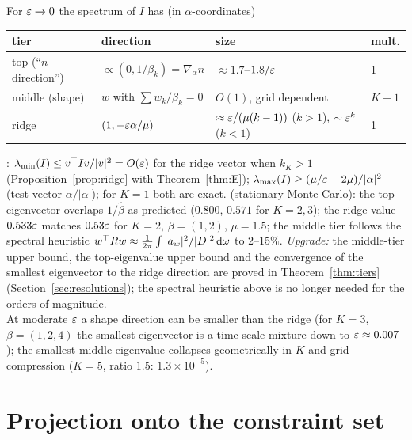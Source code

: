 \begin{proposition}\label{prop:tiers}
For $\varepsilon\to0$ the spectrum of $I$ has (in $\alpha$-coordinates)
\begin{center}
\begin{tabular}{@{}llll@{}}\toprule
tier & direction & size & mult.\\\midrule
top (``$n$-direction'') & $\propto(0,1/\beta_k)=\nabla_\alpha n$ & $\approx1.7$--$1.8/\varepsilon$ & 1\\
middle (shape) & $w$ with $\sum w_k/\beta_k=0$ & $O(1)$, grid dependent & $K-1$\\
ridge & $(1,-\varepsilon\alpha/\mu)$ & $\approx\varepsilon/(\mu(k-1))$ ($k>1$), $\sim\varepsilon^k$ ($k<1$) & 1\\\bottomrule
\end{tabular}
\end{center}
\Pt{}: $\lambda_{\min}(I)\le v^{\top} Iv/|v|^2=O(\varepsilon)$ for the ridge vector when $k_K>1$ (Proposition~\ref{prop:ridge} with Theorem~\ref{thm:E}); $\lambda_{\max}(I)\ge(\mu/\varepsilon-2\mu)/|\alpha|^2$ (test vector $\alpha/|\alpha|$); for $K=1$ both are exact.
\Nt{} (stationary Monte Carlo): the top eigenvector overlaps $1/\hat\beta$ as predicted ($0.800$, $0.571$ for $K=2,3$); the ridge value $0.533\varepsilon$ matches $0.53\varepsilon$ for $K=2$, $\beta=(1,2)$, $\mu=1.5$; the middle tier follows the spectral heuristic $w^{\top} Rw\approx\frac1{2\pi}\int|a_w|^2/|D|^2\,\mathrm d\omega$ to $2$--$15\%$.
\emph{Upgrade:} the middle-tier upper bound, the top-eigenvalue upper bound and the convergence of the smallest eigenvector to the ridge direction are proved in Theorem~\ref{thm:tiers} (Section~\ref{sec:resolutions}); the spectral heuristic above is no longer needed for the orders of magnitude.\\
At moderate $\varepsilon$ a shape direction can be smaller than the ridge (for $K=3$, $\beta=(1,2,4)$ the smallest eigenvector is a time-scale mixture down to $\varepsilon\approx0.007$); the smallest middle eigenvalue collapses geometrically in $K$ and grid compression ($K=5$, ratio $1.5$: $1.3\times10^{-5}$).
\end{proposition}



\section{Projection onto the constraint set}\label{sec:projection}

